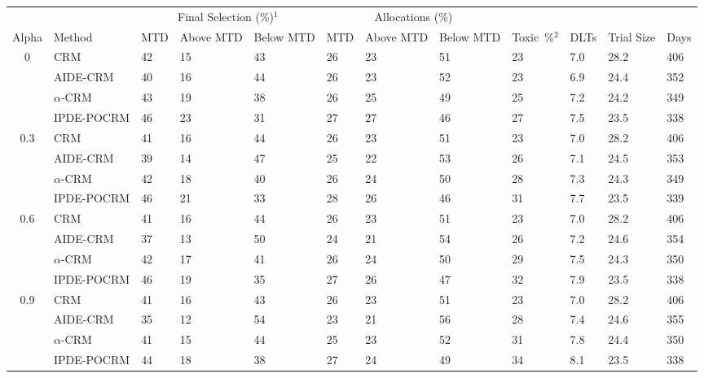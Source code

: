 \begin{tabular*}{\textwidth}{@{\extracolsep\fill}clllllllllll@{\extracolsep\fill}}
\toprule
&  & \multicolumn{3}{c}{Final Selection (\%)$^1$} & \multicolumn{3}{c}{Allocations (\%)} & &  &  &  \\
\multirow{2}{2em}{Alpha} & \multirow{2}{2em}{Method} & \multirow{2}{2em}{MTD} & \multirow{2}{2em}{Above MTD} & \multirow{2}{2em}{Below MTD} & \multirow{2}{2em}{MTD} & \multirow{2}{2em}{Above MTD} & \multirow{2}{2em}{Below MTD} & \multirow{2}{2em}{Toxic~\%$^2$} & \multirow{2}{2em}{DLTs} & \multirow{2}{2em}{Trial Size} & \multirow{2}{2em}{Days}  \\ \\ 
\midrule
\multirow{4}{2em}{0} & CRM & 42 & 15 & 43 & 26 & 23 & 51 & 23 & 7.0 & 28.2 & 406\\
 & AIDE-CRM & 40 & 16 & 44 & 26 & 23 & 52 & 23 & 6.9 & 24.4 & 352\\
 & $\alpha$-CRM & 43 & 19 & 38 & 26 & 25 & 49 & 25 & 7.2 & 24.2 & 349\\
 & IPDE-POCRM & 46 & 23 & 31 & 27 & 27 & 46 & 27 & 7.5 & 23.5 & 338\\
\midrule
\multirow{4}{2em}{0.3} & CRM & 41 & 16 & 44 & 26 & 23 & 51 & 23 & 7.0 & 28.2 & 406\\
 & AIDE-CRM & 39 & 14 & 47 & 25 & 22 & 53 & 26 & 7.1 & 24.5 & 353\\
 & $\alpha$-CRM & 42 & 18 & 40 & 26 & 24 & 50 & 28 & 7.3 & 24.3 & 349\\
 & IPDE-POCRM & 46 & 21 & 33 & 28 & 26 & 46 & 31 & 7.7 & 23.5 & 339\\
\midrule
\multirow{4}{2em}{0.6} & CRM & 41 & 16 & 44 & 26 & 23 & 51 & 23 & 7.0 & 28.2 & 406\\
 & AIDE-CRM & 37 & 13 & 50 & 24 & 21 & 54 & 26 & 7.2 & 24.6 & 354\\
 & $\alpha$-CRM & 42 & 17 & 41 & 26 & 24 & 50 & 29 & 7.5 & 24.3 & 350\\
 & IPDE-POCRM & 46 & 19 & 35 & 27 & 26 & 47 & 32 & 7.9 & 23.5 & 338\\
\midrule
\multirow{4}{2em}{0.9} & CRM & 41 & 16 & 43 & 26 & 23 & 51 & 23 & 7.0 & 28.2 & 406\\
 & AIDE-CRM & 35 & 12 & 54 & 23 & 21 & 56 & 28 & 7.4 & 24.6 & 355\\
 & $\alpha$-CRM & 41 & 15 & 44 & 25 & 23 & 52 & 31 & 7.8 & 24.4 & 350\\
 & IPDE-POCRM & 44 & 18 & 38 & 27 & 24 & 49 & 34 & 8.1 & 23.5 & 338\\
\bottomrule
\end{tabular*}
